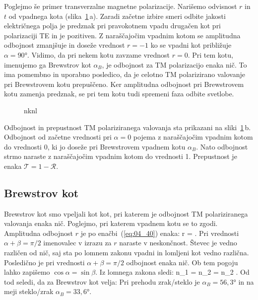 Poglejmo še primer transverzalne magnetne polarizacije. Narišemo odvisnost
$r$ in $t$ od vpadnega kota (slika~\ref{fig:04_redtm}\,a). Zaradi začetne 
izbire smeri odbite jakosti električnega polja je predznak pri pravokotnem vpadu drugačen kot pri 
polarizaciji TE in je pozitiven. Z naraščajočim vpadnim kotom se amplitudna
odbojnost zmanjšuje in doseže vrednost $r=-1$ ko se vpadni kot
približuje $\alpha = 90\si{\degree}$. Vidimo, da pri nekem kotu zavzame  
vrednost $r = 0$. Pri tem kotu, imenujemo ga Brewstrov kot $\alpha_B$, 
je odbojnost za TM polarizacijo enaka nič. To ima pomembno in uporabno
posledico, da je celotno TM polarizirano valovanje pri Brewstrovem kotu prepuščeno. 
Ker amplitudna odbojnost pri Brewstrovem kotu zamenja predznak, se pri tem
kotu tudi spremeni faza odbite svetlobe. 
\begin{figure}[ht]
\centering
\def\svgwidth{140truemm} 

\caption{nknl}
\label{fig:04_redtm}
\end{figure}

Odbojnost in prepustnost TM polariziranega valovanja sta prikazani na 
sliki~\ref{fig:04_redtm}\,b. Odbojnost od začetne vrednosti pri $\alpha=0$
pojema z naraščajočim vpadnim kotom do vrednosti 0, ki jo doseže pri 
Brewstrovem vpadnem kotu $\alpha_B$. Nato odbojnost strmo naraste z naraščajočim vpadnim
kotom do vrednosti 1. Prepustnost je enaka $\mathcal{T} = 1- \mathcal{R}$.

\subsection*{Brewstrov kot}
Brewstrov kot smo vpeljali kot kot, pri katerem je odbojnost
TM polariziranega valovanja enaka nič. Poglejmo, pri katerem
vpadnem kotu se to zgodi. Amplitudna odbojnost $r$ je po enačbi~(\ref{eq:04_40})
enaka:
\beq
r = \frac{\tan(\alpha-\beta)}{\tan(\alpha+\beta)}.
\label{eq:04_50}
\eeq
Pri vrednosti $\alpha + \beta = \pi/2$ imenovalec v izrazu za $r$ 
naraste v neskončnost. Števec je vedno različen od nič, saj
sta po lomnem zakonu vpadni in lomljeni kot vedno različna. Posledično
je pri vrednosti $\alpha + \beta = \pi/2$ odbojnost enaka nič.
Ob tem pogoju lahko zapišemo $\cos \alpha = \sin \beta$. Iz lomnega 
zakona sledi:
\beq
n_1 \sin \alpha = n_2 \sin \beta = n_2 \cos \alpha.
\label{eq:04_51}
\eeq
Od tod seledi, da za Brewstrov kot velja:
Pri prehodu zrak/steklo je $\alpha_B = 56,3\si{\degree}$ in na meji
steklo/zrak $\alpha_B = 33,6\si{\degree}$. 

